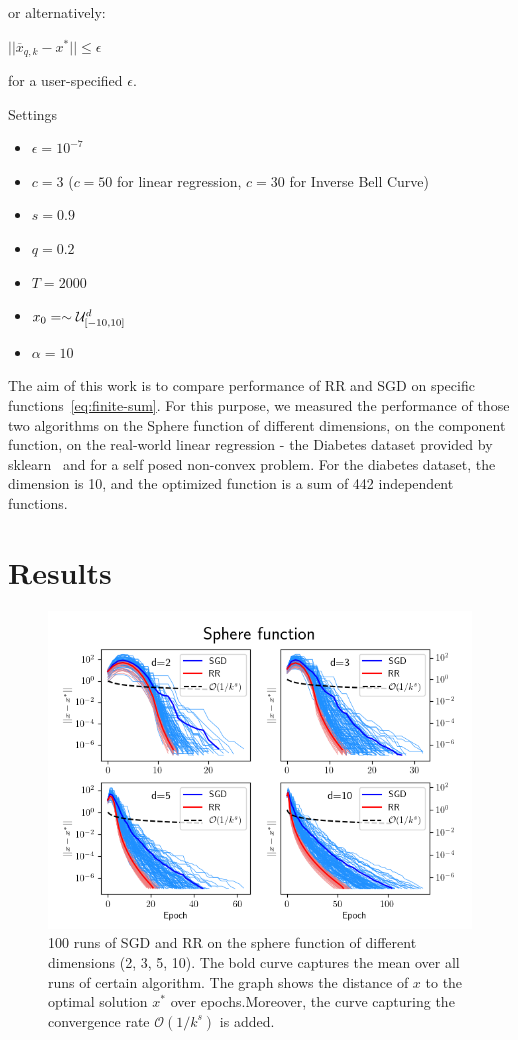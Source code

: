 \documentclass[10pt,conference,compsocconf]{IEEEtran}
\begin{document}
\noindent or alternatively:

\centerline{$||\overline{x}_{q,k} - x^{*}|| \leq \epsilon$}

\noindent for a user-specified $\epsilon$.

\noindent Settings

\begin{itemize}
\item $\epsilon = 10^{-7}$
\item $c = 3$ ($c=50$ for linear regression, $c=30$ for Inverse Bell Curve)
\item $s = 0.9$
\item $q = 0.2$
\item $T = 2000$
\item $x_0 = \sim {\cal U}_{[-10, 10]}^d$
\item $\alpha = 10$
\end{itemize}

The aim of this work is to compare performance of RR and SGD on
specific functions~\ref{eq:finite-sum}. For this purpose, we measured the
performance of those two algorithms on the Sphere function of different
dimensions, on the component function, on the real-world
linear regression - the Diabetes dataset provided by
sklearn~\cite{DIABETES,SKLEARN} and for a self posed non-convex problem. For the diabetes dataset, the dimension
is 10, and the optimized function is a sum of 442 independent functions.

\section{Results}

\begin{figure}[h]
  \centering
  \includegraphics[width=\columnwidth]{sphere_runs}
  \caption{100 runs of SGD and RR on the sphere function of different
  dimensions (2, 3, 5, 10). The bold curve captures the mean over all
  runs of certain algorithm. The graph shows the distance of $x$
  to the optimal solution $x^*$ over epochs.Moreover, the curve
  capturing the convergence rate $\mathcal{O}(1 / k^s)$ is added.}
  \vspace{-3mm}
  \label{fig:sphere1}
\end{figure}
\end{document}

